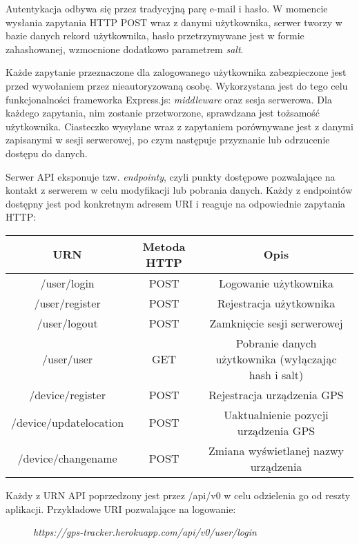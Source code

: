 \documentclass[eng,printmode]{mgr}
\begin{document}
Autentykacja odbywa się przez tradycyjną parę e-mail i hasło. W momencie wysłania zapytania HTTP POST wraz z danymi użytkownika, serwer tworzy w bazie danych rekord użytkownika, hasło przetrzymywane jest w formie zahashowanej, wzmocnione dodatkowo parametrem \textit{salt}.

Każde zapytanie przeznaczone dla zalogowanego użytkownika zabezpieczone jest przed wywołaniem przez nieautoryzowaną osobę. Wykorzystana jest do tego celu funkcjonalności frameworka Express.js: \textit{middleware} oraz sesja serwerowa. Dla każdego zapytania, nim zostanie przetworzone, sprawdzana jest tożsamość użytkownika. Ciasteczko wysyłane wraz z zapytaniem porównywane jest z danymi zapisanymi w sesji serwerowej, po czym następuje przyznanie lub odrzucenie dostępu do danych.


Serwer API eksponuje tzw. \textit{endpointy}, czyli punkty dostępowe pozwalające na kontakt z serwerem w celu modyfikacji lub pobrania danych. Każdy z endpointów dostępny jest pod konkretnym adresem URI i reaguje na odpowiednie zapytania HTTP: 
\begin{center}
 \begin{tabular}{||c c c||} 
 \hline
 URN & Metoda HTTP & Opis \\ [0.5ex] 
 \hline\hline
 /user/login & POST & Logowanie użytkownika \\ 
 \hline
 /user/register & POST & Rejestracja użytkownika\\
 \hline
 /user/logout & POST & Zamknięcie sesji serwerowej\\
 \hline
 /user/user & GET & Pobranie danych użytkownika (wyłączając hash i salt)\\
 \hline
 /device/register & POST & Rejestracja urządzenia GPS  \\  
 \hline
  /device/updatelocation & POST & Uaktualnienie pozycji urządzenia GPS  \\  
 \hline
  /device/changename & POST & Zmiana wyświetlanej nazwy urządzenia \\  
 \hline
\end{tabular}
\end{center}

Każdy z URN API poprzedzony jest przez /api/v0 w celu odzielenia go od reszty aplikacji. 
Przykładowe URI pozwalające na logowanie:
\begin{figure}[ht]
\begin{center}
\textit{https://gps-tracker.herokuapp.com/api/v0/user/login}
\end{center}
\end{figure}
\end{document}
